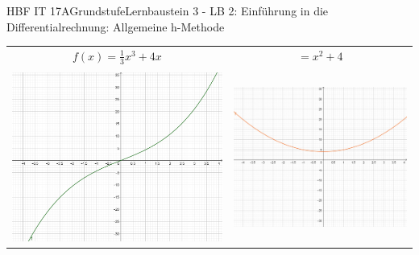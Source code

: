 \documentclass[oneside,openany,headings=optiontotoc,11pt,numbers=noenddot]{scrreprt}
\begin{document}
	\begin{worksheet}{HBF IT 17A}{Grundstufe}{Lernbaustein 3 - LB 2: Einführung in die Differentialrechnung: Allgemeine h-Methode}
		
		\noindent
		\begin{framed}
			\begin{center}
				\begin{tabularx}{\textwidth}{X|X}
					\multicolumn{1}{c}{\(f(x) = \frac{1}{3}x^3 + 4x\)} & \multicolumn{1}{c}{\( = x^2 + 4\)}\\
					\\
					\includegraphics[scale=0.25]{Bilder/fx.jpg} & \includegraphics[scale=0.25]{Bilder/f-x.jpg}
				\end{tabularx}
			\end{center}
		\end{framed}
	

\end{worksheet}
\end{document}
